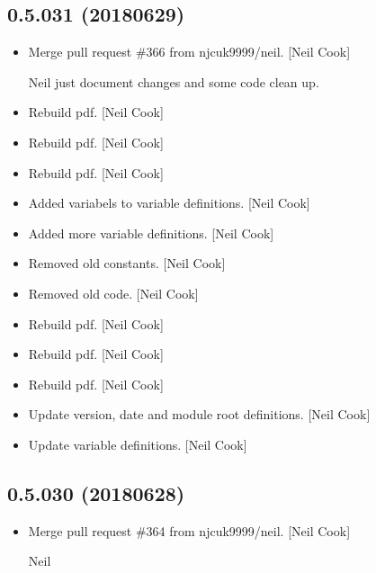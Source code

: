 \documentclass[a4paper,10pt,english]{report}
\begin{document}
\subsection{0.5.031 (2018\sphinxhyphen{}06\sphinxhyphen{}29)}
\label{\detokenize{misc/changelog:id424}}\begin{itemize}
\item {} 
Merge pull request \#366 from njcuk9999/neil. {[}Neil Cook{]}

Neil \sphinxhyphen{} just document changes and some code clean up.

\item {} 
Rebuild pdf. {[}Neil Cook{]}

\item {} 
Rebuild pdf. {[}Neil Cook{]}

\item {} 
Rebuild pdf. {[}Neil Cook{]}

\item {} 
Added variabels to  variable definitions. {[}Neil Cook{]}

\item {} 
Added more  variable definitions. {[}Neil Cook{]}

\item {} 
Removed old  constants. {[}Neil Cook{]}

\item {} 
Removed old  code. {[}Neil Cook{]}

\item {} 
Rebuild pdf. {[}Neil Cook{]}

\item {} 
Rebuild pdf. {[}Neil Cook{]}

\item {} 
Rebuild pdf. {[}Neil Cook{]}

\item {} 
Update version, date and module root definitions. {[}Neil Cook{]}

\item {} 
Update variable definitions. {[}Neil Cook{]}

\end{itemize}


\subsection{0.5.030 (2018\sphinxhyphen{}06\sphinxhyphen{}28)}
\label{\detokenize{misc/changelog:id425}}\begin{itemize}
\item {} 
Merge pull request \#364 from njcuk9999/neil. {[}Neil Cook{]}

Neil

\end{itemize}
\end{document}
